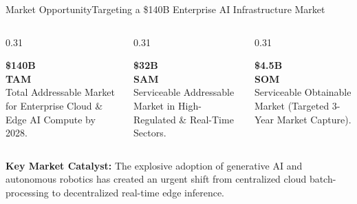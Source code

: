 \documentclass[aspectratio=169,10pt]{beamer}
\begin{document}
\begin{frame}{Market Opportunity}{Targeting a \$140B Enterprise AI Infrastructure Market}
  \begin{columns}[T]
    \begin{column}{0.31\textwidth}
      \begin{tcolorbox}[darkcard, halign=center]
        {\Large \bfseries \color{neoncyan} \$140B} \\
        \vspace*{0.1cm}
        {\small \textbf{TAM}} \\
        \tiny Total Addressable Market for Enterprise Cloud \& Edge AI Compute by 2028.
      \end{tcolorbox}
    \end{column}
    
    \begin{column}{0.31\textwidth}
      \begin{tcolorbox}[cyancard, halign=center]
        {\Large \bfseries \color{neonpurple} \$32B} \\
        \vspace*{0.1cm}
        {\small \textbf{SAM}} \\
        \tiny Serviceable Addressable Market in High-Regulated \& Real-Time Sectors.
      \end{tcolorbox}
    \end{column}
    
    \begin{column}{0.31\textwidth}
      \begin{tcolorbox}[emeraldcard, halign=center]
        {\Large \bfseries \color{emeralds} \$4.5B} \\
        \vspace*{0.1cm}
        {\small \textbf{SOM}} \\
        \tiny Serviceable Obtainable Market (Targeted 3-Year Market Capture).
      \end{tcolorbox}
    \end{column}
  \end{columns}

  \vspace*{0.3cm}
  \begin{tcolorbox}[darkcard]
    \small \textbf{Key Market Catalyst:} The explosive adoption of generative AI and autonomous robotics has created an urgent shift from centralized cloud batch-processing to decentralized real-time edge inference.
  \end{tcolorbox}
\end{frame}
\end{document}
